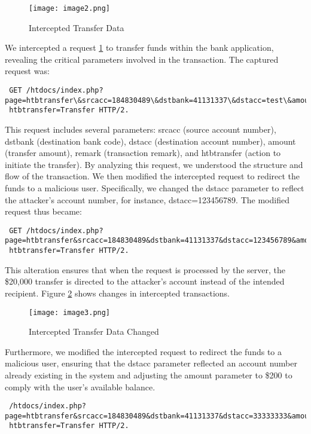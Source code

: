 \begin{figure}[H]
    \centering
    \texttt{[image: image2.png]}
    \caption{Intercepted Transfer Data}
    \label{fig:interceptedTransferData}
\end{figure}
We intercepted a request \ref{fig:interceptedTransferData} to transfer funds within the bank application, revealing the critical parameters involved in the transaction. 
The captured request was: 
\begin{tiny}
    \begin{verbatim}
 GET /htdocs/index.php?page=htbtransfer\&srcacc=184830489\&dstbank=41131337\&dstacc=test\&amount=20000\&remark=dusan\&
 htbtransfer=Transfer HTTP/2. 
    \end{verbatim}
\end{tiny}

This request includes several parameters: srcacc (source account number), dstbank (destination bank code), dstacc (destination account number), amount (transfer amount), remark (transaction remark), and htbtransfer (action to initiate the transfer). By analyzing this request, we understood the structure and flow of the transaction. We then modified the intercepted request to redirect the funds to a malicious user. Specifically, we changed the dstacc parameter to reflect the attacker's account number, for instance, dstacc=123456789. The modified request thus became: 
\begin{tiny}
\begin{verbatim} 
 GET /htdocs/index.php?page=htbtransfer&srcacc=184830489&dstbank=41131337&dstacc=123456789&amount=20000&remark=dusan&
 htbtransfer=Transfer HTTP/2. 
\end{verbatim}
\end{tiny}

This alteration ensures that when the request is processed by the server, the \$20,000 transfer is directed to the attacker’s account instead of the intended recipient. Figure \ref{fig:interceptedTransferDataChanged} shows changes in intercepted transactions.
\begin{figure}[H]
    \centering
    \texttt{[image: image3.png]}
    \caption{Intercepted Transfer Data Changed}
    \label{fig:interceptedTransferDataChanged}
\end{figure}

Furthermore, we modified the intercepted request to redirect the funds to a malicious user, ensuring that the dstacc parameter reflected an account number already existing in the system and adjusting the amount parameter to \$200 to comply with the user's available balance.
\begin{tiny}
\begin{verbatim} 
 /htdocs/index.php?page=htbtransfer&srcacc=184830489&dstbank=41131337&dstacc=33333333&amount=200&remark=dusan&
 htbtransfer=Transfer HTTP/2. 
\end{verbatim}
\end{tiny}

